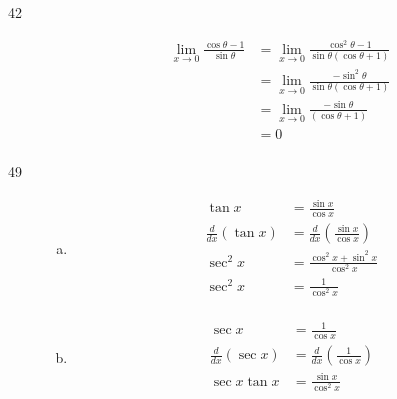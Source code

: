 \documentclass[letterpaper, landscape]{exam}
\begin{document}
\begin{description}
    \item[42] 
      \begin{align*}
        \lim_{x \to 0} \frac{\cos \theta - 1}{\sin \theta} 
          & = \lim_{x \to 0} \frac{\cos^2 \theta - 1}{\sin \theta (\cos \theta + 1)} \\
          & = \lim_{x \to 0} \frac{- \sin^2 \theta}{\sin \theta (\cos \theta + 1)} \\
          & = \lim_{x \to 0} \frac{- \sin \theta}{(\cos \theta + 1)} \\
          & = \boxed{ 0 } \\
      \end{align*}

    \item[49]
      \begin{enumerate}[(a)]
        \item 
          \begin{align*}
            \tan x                  & = \frac{\sin x}{\cos x} \\
            \frac{d}{dx} ( \tan x ) & = \frac{d}{dx} \left( \frac{\sin x}{\cos x} \right) \\
            \sec^2 x                & =  \frac{\cos^2 x + \sin^2 x}{\cos^2 x} \\
            \sec^2 x                & =  \frac{1}{\cos^2 x} \\
          \end{align*}

        \item
          \begin{align*}
            \sec x                  & = \frac{1}{\cos x} \\
            \frac{d}{dx} ( \sec x ) & = \frac{d}{dx} \left( \frac{1}{\cos x} \right) \\
            \sec x \tan x           & = \frac{\sin x}{\cos^2 x} \\
          \end{align*}


\end{enumerate}
\end{description}
\end{document}
